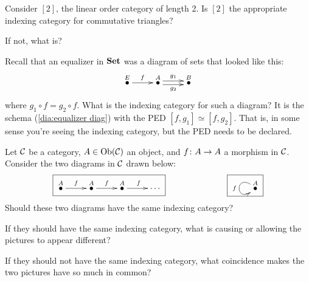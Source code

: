 \documentclass[CT4S-EN-RU]{subfiles}
\begin{document}
\begin{exampleRUS}\label{ex:comm vs noncomm diags}
\end{exampleRUS}

\begin{exerciseENG}
Consider $[2]$, the linear order category of length 2.
\sexc Is $[2]$ the appropriate indexing category for commutative triangles?
\item If not, what is?
\endsexc
\end{exerciseENG}

\begin{exerciseRUS}
\end{exerciseRUS}

\begin{exampleENG}
Recall that an equalizer in ${\bf Set}$ was a diagram of sets that looked like this:
\begin{align}\label{dia:equalizer diag}
\xymatrix{\LMO{E}\ar[r]^f&\LMO{A}\ar@<.5ex>[r]^{g_1}\ar@<-.5ex>[r]_{g_2}&\LMO{B}}
\end{align}
where $g_1\circ f=g_2\circ f$. What is the indexing category for such a diagram? It is the schema (\ref{dia:equalizer diag}) with the PED $[f,g_1]\simeq[f,g_2]$. That is, in some sense you're seeing the indexing category, but the PED needs to be declared.
\end{exampleENG}

\begin{exampleRUS}
\end{exampleRUS}

\begin{exerciseENG}\label{exc:coincidence}
Let $\mathcal{C}$ be a category, $A\in\textnormal{Ob}(\mathcal{C})$ an object, and $f\colon A\rightarrow A$ a morphism in $\mathcal{C}$. Consider the two diagrams in $\mathcal{C}$ drawn below:
$$\fbox{\xymatrix{\LMO{A}\ar[r]^f&\LMO{A}\ar[r]^f&\LMO{A}\ar[r]^f&\cdots}}\hspace{1in}\fbox{\xymatrix{\LMO{A}\ar@(ul,dl)[]_f}}$$
\sexc Should these two diagrams have the same indexing category?
\item If they should have the same indexing category, what is causing or allowing the pictures to appear different?
\item If they should not have the same indexing category, what coincidence makes the two pictures have so much in common?
\endsexc
\end{exerciseENG}

\begin{exerciseRUS}\label{exc:coincidence}
\end{exerciseRUS}
\end{document}
